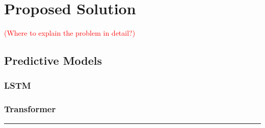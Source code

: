 \chapter{Proposed Solution}
\label{chapter:proposed_solution}

\textcolor{red}{(Where to explain the problem in detail?)}

\section{Predictive Models}

\subsection{LSTM}

\subsection{Transformer}


{\color{red} \rule{\linewidth}{0.5mm}}

